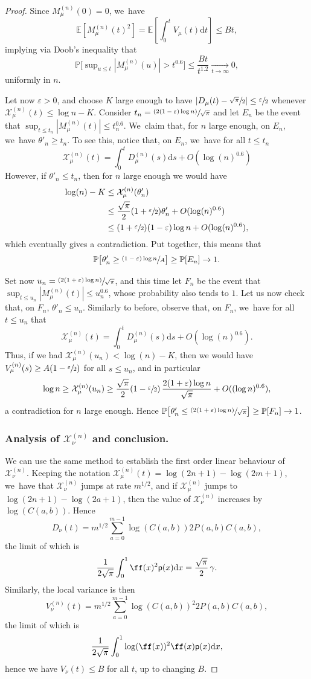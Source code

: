 \documentclass[JEP,XML,SOM,Unicode,NoFloatCountersInSection, NoEqCountersInSection,published]{cedram}
\newcommand{\psfrac}[2]{\sfrac{(#1)}{#2}}
\newcommand{\Xmun}{\mathcal{X}^{(n)}_{\mu}}
\newcommand{\Xnun}{\mathcal{X}^{(n)}_{\nu}}
\newcommand{\pp}{\mathsf{p}}
\newcommand{\E}{\mathbb{E}}
\newcommand{\pr}{\mathbb{P}}
\let\veps\varepsilon
\newcommand{\dd}{\mathrm{d}}
\theoremstyle{definition}
\begin{document}
\begin{proof}
Since $M^{(n)}_{\mu}(0)=0$, we~have
\[
\E[M^{(n)}_{\mu}(t)^2]=\E\left[\int_{0}^t V_{\mu}(t)\mathrm d t\right]\leq Bt,
\]
implying via Doob's inequality that
\[
\pr\bigl[\sup \nolimits_{u\leq t} |M^{(n)}_{\mu}(u)|>t^{0.6}\bigr]\leq \frac{Bt}{t^{1.2}} \xrightarrow[\textstyle t\to\infty]{} 0,
\]
uniformly in $n$.

Let now $\veps>0$, and choose $K$ large enough to have $|D_{\mu}(t)-\sfrac{\sqrt{\pi}}{2}|\leq \sfrac{\veps}{2}$ whenever $\Xmun(t)\leq \log n - K$. Consider $t_n=\psfrac{2(1-\veps)\log n}{\sqrt{\pi}}$ and let $E_n$ be the event that $\sup_{t\leq t_n}|M^{(n)}_{\mu}(t) |\leq t_n^{0.6}$. We~claim that, for $n$ large enough, on $E_n$, we~have $\theta'_n\geq t_n$. To see this, notice that, on $E_n$, we~have for all $t\leq t_n$
\[
\Xmun(t)=\int_0^t D^{(n)}_{\mu}(s)\mathrm ds + O(\log(n)^{0.6})
\]
However, if $\theta'_n\leq t_n$, then for $n$ large enough we would have
\begin{align*}
\log(n)-K &\leq \Xmun(\theta'_n)\\
&\leq \frac{\sqrt{\pi}}{2}(1+\sfrac{\veps}{2})\theta'_n +O(\log(n)^{0.6}) \\
&\leq (1+\sfrac{\veps}{2})(1-\veps)\log n +O(\log(n)^{0.6}),
\end{align*}
which eventually gives a contradiction. Put together, this means that
\[
\pr\bigl[\theta'_n\geq \sfrac{(1-\veps)\log n}{A}\bigr]\geq \pr[E_n] \to 1.
\]

Set now $u_n=\psfrac{2(1+\veps)\log n}{\sqrt{\pi}}$, and this time let $F_n$ be the event that $\sup_{t\leq u_n}| M^{(n)}_{\mu}(t)| \leq u_n^{0.6}$, whose probability also tends to $1$. Let us now check that, on $F_n$, $\theta'_n\leq u_n$. Similarly to before, observe that, on $F_n$, we~have for all $t\leq u_n$ that
\[
\Xmun(t)=\int_0^t D^{(n)}_{\mu}(s)\mathrm ds + O(\log(n)^{0.6}).
\]
Thus, if we had $\Xmun(u_n)< \log(n)-K$,
then we would have $V^{(n)}_{\mu}(s)\geq A(1-\sfrac{\veps}{2})$ for all $s\leq u_n$, and in particular
\[
\log n \geq \Xmun(u_n)\geq \frac{\sqrt{\pi}}{2}(1-\sfrac{\veps}{2})\,\frac{2(1+\veps)\log n}{\sqrt{\pi}}+ O((\log n)^{0.6}),
\]
a contradiction for $n$ large enough. Hence $\pr\bigl[\theta'_n\leq \psfrac{2(1+\veps)\log n}{\sqrt{\pi}}\bigr]\geq \pr[F_n]\to 1$.

\subsubsection*{Analysis of $\Xnun$ and conclusion.}
We can use the same method to establish the first order linear behaviour of $\Xnun$. Keeping the notation $\Xmun(t)=\log (2n+1) - \log (2m+1)$, we~have that $\Xnun$ jumps at rate $m^{1/2}$, and if $\Xmun$ jumps to $\log (2n+1) - \log (2a+1)$, then the value of $\Xnun$ increases by $\log(C(a,b))$. Hence
\[
D_{\nu}(t)=m^{1/2}\sum_{a=0}^{m-1} \log (C(a,b)) 2P(a,b)C(a,b),
\]
the limit of which is
\[
\frac1{2\sqrt{\pi}}\int_{0}^1 \ff(x)^2\pp(x)\dd x=\frac{\sqrt{\pi}}{2}\,\gamma.
\]
Similarly, the local variance is then
\[
V_{\nu}^{(n)}(t)=m^{1/2}\sum_{a=0}^{m-1} \log(C(a,b))^2 2P(a,b)C(a,b),
\]
the limit of which is
\[
\frac1{2\sqrt{\pi}}\int_{0}^1 \log(\ff(x))^2\ff(x)\pp(x)\dd x,
\]
hence we have $V_{\nu}(t)\leq B$ for all $t$, up to changing $B$.


\end{proof}
\end{document}
